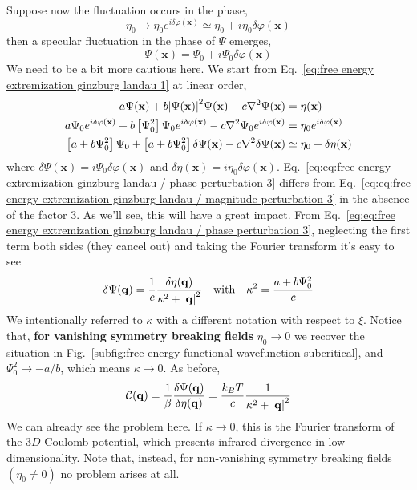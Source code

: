 Suppose now the fluctuation occurs in the phase,
\[
    \eta_0 \to \eta_0 e^{i \delta \varphi(\mathbf{x})} \simeq \eta_0 + i \eta_0 \delta \varphi(\mathbf{x})
\]
then a specular fluctuation in the phase of $\Psi$ emerges,
\[
    \Psi(\mathbf{x}) = \Psi_0 + i \Psi_0 \delta \varphi(\mathbf{x})
\]
We need to be a bit more cautious here. We start from Eq.~\eqref{eq:free energy extremization ginzburg landau 1} at linear order,
\begin{align}
     a \Psi(\mathbf{x}) + b \abs{\Psi(\mathbf{x})}^2 \Psi(\mathbf{x}) - c \laplacian \Psi(\mathbf{x}) &= \eta(\mathbf{x}) \label{eq:eq:free energy extremization ginzburg landau / phase perturbation 1} \\
     a \Psi_0 e^{i \delta \varphi(\mathbf{x})} + b \lrS{ \Psi_0^2 } \Psi_0 e^{i \delta \varphi(\mathbf{x})} - c \laplacian \Psi_0 e^{i \delta \varphi(\mathbf{x})} &= \eta_0 e^{i \delta \varphi(\mathbf{x})} \label{eq:eq:free energy extremization ginzburg landau / phase perturbation 2} \\
     \lrS{a + b \Psi_0^2} \Psi_0 + \lrS{a + b \Psi_0^2} \delta \Psi(\mathbf{x}) - c \laplacian \delta \Psi(\mathbf{x}) &\simeq \eta_0 + \delta\eta (\mathbf{x}) \label{eq:eq:free energy extremization ginzburg landau / phase perturbation 3}
\end{align}
where $\delta\Psi(\mathbf{x}) = i \Psi_0 \delta \varphi(\mathbf{x})$ and $\delta\eta(\mathbf{x}) = i \eta_0 \delta \varphi(\mathbf{x})$. Eq.~\eqref{eq:eq:free energy extremization ginzburg landau / phase perturbation 3} differs from Eq.~\eqref{eq:eq:free energy extremization ginzburg landau / magnitude perturbation 3} in the absence of the factor $3$. As we'll see, this will have a great impact. From Eq.~\eqref{eq:eq:free energy extremization ginzburg landau / phase perturbation 3}, neglecting the first term both sides (they cancel out) and taking the Fourier transform it's easy to see
\[
    \delta\Psi(\mathbf{q}) = \frac{1}{c} \frac{\delta\eta(\mathbf{q})}{\kappa^2 + \abs{\mathbf{q}}^2} \qq{with}
    \kappa^2 = \frac{a + b\Psi_0^2}{c}
\]
We intentionally referred to $\kappa$ with a different notation with respect to $\xi$.
Notice that, \textbf{for vanishing symmetry breaking fields} $\eta_0 \to 0$ we recover the situation in Fig.~\ref{subfig:free energy functional wavefunction subcritical}, and $\Psi_0^2 \to -a/b$, which means $\kappa \to 0$. As before,
\[
    \mathcal{C}(\mathbf{q}) = \frac{1}{\beta} \fdv{\Psi(\mathbf{q})}{\eta(\mathbf{q})} = \frac{k_B T}{c} \frac{1}{\kappa^2 + \abs{\mathbf{q}}^2}
\]
We can already see the problem here. If $\kappa\to0$, this is the Fourier transform of the $3D$ Coulomb potential, which presents infrared divergence in low dimensionality. Note that, instead, for non-vanishing symmetry breaking fields $(\eta_0 \neq 0)$ no problem arises at all.\\


